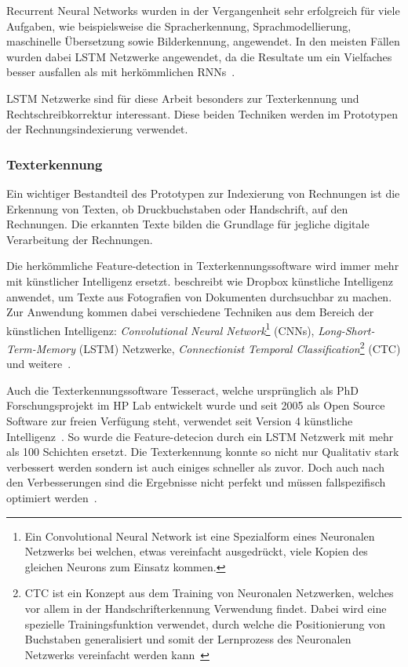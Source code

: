 Recurrent Neural Networks wurden in der Vergangenheit sehr erfolgreich für viele Aufgaben, wie beispielsweise die Spracherkennung, Sprachmodellierung, maschinelle Übersetzung sowie Bilderkennung, angewendet. In den meisten Fällen wurden dabei LSTM Netzwerke angewendet, da die Resultate um ein Vielfaches besser ausfallen als mit herkömmlichen RNNs~\autocite{Olah2015}.

LSTM Netzwerke sind für diese Arbeit besonders zur Texterkennung und Rechtschreibkorrektur interessant. Diese beiden Techniken werden im Prototypen der Rechnungsindexierung verwendet.

\subsubsection{Texterkennung}

Ein wichtiger Bestandteil des Prototypen zur Indexierung von Rechnungen ist die Erkennung von Texten, ob Druckbuchstaben oder Handschrift, auf den Rechnungen. Die erkannten Texte bilden die Grundlage für jegliche digitale Verarbeitung der Rechnungen.

Die herkömmliche Feature-detection in Texterkennungssoftware wird immer mehr mit künstlicher Intelligenz ersetzt. \textcite{Neuberg2017} beschreibt wie Dropbox künstliche Intelligenz anwendet, um Texte aus Fotografien von Dokumenten durchsuchbar zu machen. Zur Anwendung kommen dabei verschiedene Techniken aus dem Bereich der künstlichen Intelligenz: \textit{Convolutional Neural Network}\footnote{Ein Convolutional Neural Network ist eine Spezialform eines Neuronalen Netzwerks bei welchen, etwas vereinfacht ausgedrückt, viele Kopien des gleichen Neurons zum Einsatz kommen\autocite{Olah2014}.} (CNNs),  \textit{Long-Short-Term-Memory} (LSTM) Netzwerke, \textit{Connectionist Temporal Classification}\footnote{CTC ist ein Konzept aus dem Training von Neuronalen Netzwerken, welches vor allem in der Handschrifterkennung Verwendung findet. Dabei wird eine spezielle Trainingsfunktion verwendet, durch welche die Positionierung von Buchstaben generalisiert und somit der Lernprozess des Neuronalen Netzwerks vereinfacht werden kann~\autocite{Scheidl2018}} (CTC) und weitere~\autocite{Neuberg2017}.

Auch die Texterkennungssoftware Tesseract, welche ursprünglich als PhD Forschungsprojekt im HP Lab entwickelt wurde und seit 2005 als Open Source Software zur freien Verfügung steht, verwendet seit Version 4 künstliche Intelligenz~\autocite{Smith2007}. So wurde die Feature-detecion durch ein LSTM Netzwerk mit mehr als 100 Schichten ersetzt. Die Texterkennung konnte so nicht nur Qualitativ stark verbessert werden sondern ist auch einiges schneller als zuvor. Doch auch nach den Verbesserungen sind die Ergebnisse nicht perfekt und müssen fallspezifisch optimiert werden~\autocite{O.V.2018, O.V.2018a}.

